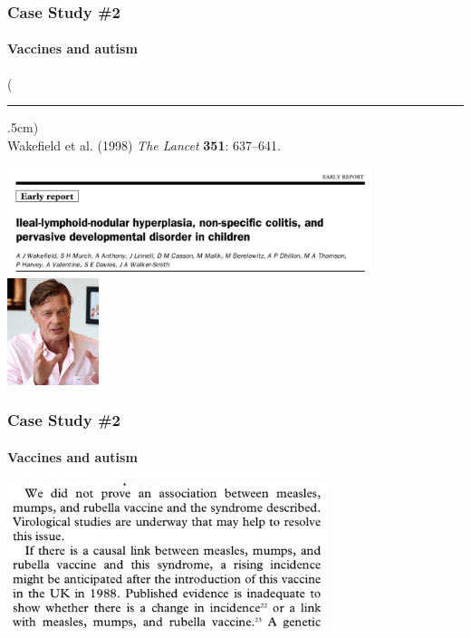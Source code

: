 \documentclass[10pt]{beamer}
\newenvironment{reference}[2]{%
	\begin{textblock*}{\textwidth}(#1,#2)
		\tiny\bgroup\color{gray}}{\egroup\end{textblock*}}
\begin{document}
\begin{frame}[t]
\frametitle{Case Study \#2}
\framesubtitle{Vaccines and autism}

	\begin{reference}{4mm}{92mm}
		\rule{1.5cm}{0.25pt}\\
		Wakefield et al. (1998) \emph{The Lancet} \textbf{351}: 637--641.
	\end{reference}
	
	\begin{center}
		\includegraphics[width=0.8\textwidth]{figures/wakefield_paper.png}\\
		\vspace{0.5cm}
		\includegraphics[width=0.2\textwidth]{figures/wakefield.jpg}
	\end{center}
\end{frame}


\begin{frame}
\frametitle{Case Study \#2}
\framesubtitle{Vaccines and autism}

	\begin{center}
		\includegraphics[width=0.7\textwidth]{figures/wakefield_paper2.png}
	\end{center}
\end{frame}
\end{document}

